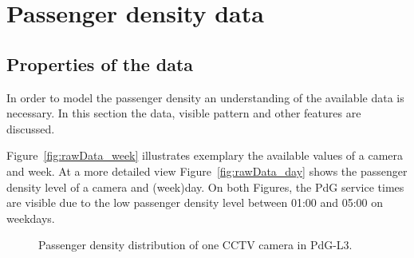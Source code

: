\section{Passenger density data}

\subsection{Properties of the data}
\label{sec:PassengerDensityData}

In order to model the passenger density an understanding of the available data is necessary. In this section the data, visible pattern and other features are discussed.

Figure~\ref{fig:rawData_week} illustrates exemplary the available values of a camera and week. At a more detailed view Figure~\ref{fig:rawData_day} shows the passenger density level of a camera and (week)day. On both Figures, the PdG service times are visible due to the low passenger density level between 01:00 and 05:00 on weekdays.

\begin{figure}[htbp]

  \centering

  \hfill

  \caption{Passenger density distribution of one CCTV camera in PdG-L3.}
  \label{fig:rawData}

\end{figure}


